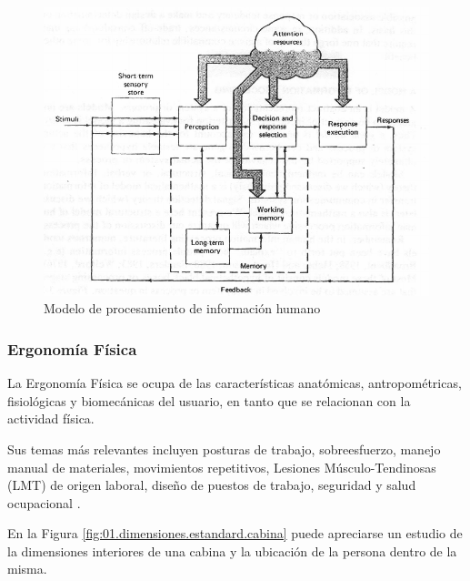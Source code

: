 \begin{figure}[!htb]
  \centering
  \includegraphics[width=0.8\linewidth]{01.tablero.instrumentos/U01.imagenes/1.1.introduccion/01-modelo_humano_procesamiento_informacion.png}
  
  \caption{Modelo  de procesamiento de informaci\'on humano \protect\cite{sanders1993human}}
\label{fig:01.modelo.de.procesamiento.informacion.humano}
\end{figure}



\subsubsection{ Ergonom\'ia F\'isica}
\label{sec:ergonomia.fisica}

La Ergonom\'ia F\'isica se ocupa de las caracter\'isticas anat\'omicas, antropom\'etricas, fisiol\'ogicas y biomec\'anicas del usuario, en tanto que se relacionan con la actividad f\'isica.

Sus temas m\'as relevantes incluyen posturas de trabajo, sobreesfuerzo, manejo manual de materiales, movimientos repetitivos, Lesiones M\'usculo-Tendinosas (LMT) de origen laboral, dise\~no de puestos de trabajo, seguridad y salud ocupacional \cite{wiki_ergonomia_fisica}. 

En la Figura \ref{fig:01.dimensiones.estandard.cabina} puede apreciarse un estudio de la dimensiones interiores de una cabina y la ubicaci\'on de la persona dentro de la misma.


